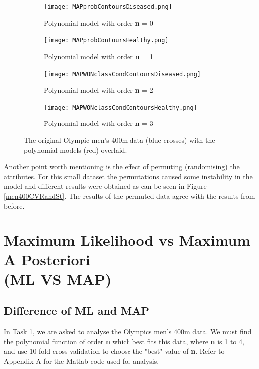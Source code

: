 {{	\begin{figure}[h!] 
		\centering
		\begin{subfigure}[b]{0.4\textwidth}
			\texttt{[image: MAPprobContoursDiseased.png]}
			\caption{Polynomial model with order \textbf{n} = 0}
			\label{fig:model0}
		\end{subfigure}
		\begin{subfigure}[b]{0.4\textwidth}
			\texttt{[image: MAPprobContoursHealthy.png]}
			\caption{Polynomial model with order \textbf{n} = 1}
			\label{fig:model1}
		\end{subfigure}
		\begin{subfigure}[b]{0.4\textwidth}
			\texttt{[image: MAPWONclassCondContoursDiseased.png]}
			\caption{Polynomial model with order \textbf{n} = 2}
			\label{fig:model2}
		\end{subfigure}
		\begin{subfigure}[b]{0.4\textwidth}
			\texttt{[image: MAPWONclassCondContoursHealthy.png]}
			\caption{Polynomial model with order \textbf{n} = 3}
			\label{fig:model3}
		\end{subfigure}
		\caption{The original Olympic men's 400m data (blue crosses) with the polynomial models (red) overlaid.}
		\label{men400-1}
	\end{figure}
	
	Another point worth mentioning is the effect of permuting (randomising) the attributes. For this small dataset the permutations caused some instability in the model and different results were obtained as can be seen in Figure \ref{men400CVRandSt}. The results of the permuted data agree with the results from before.
	
\newpage	
\section{Maximum Likelihood vs Maximum A Posteriori  \\ (ML VS MAP)}{\label{s1}
	
	\subsection{Difference of ML and MAP}\label{Int}
	In Task 1, we are asked to analyse the Olympics men's 400m data. We must find the polynomial function of order \textbf{n} which best fits this data, where \textbf{n} is 1 to 4, and use 10-fold cross-validation to choose the "best" value of \textbf{n}. Refer to Appendix A for the Matlab code used for analysis.
	
}}}

